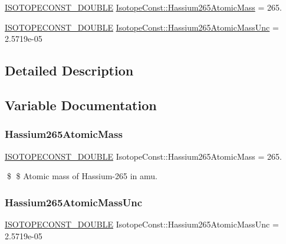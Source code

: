 \begin{DoxyCompactItemize}
\item 
\mbox{\hyperlink{group___isotope_const-_macros_ga8f45a7272ce02c0b4c65c44636ed719a}{I\+S\+O\+T\+O\+P\+E\+C\+O\+N\+S\+T\+\_\+\+D\+O\+U\+B\+LE}} \mbox{\hyperlink{group___isotope_const-_hassium-_hs265_ga317437d04e20725023eb9a24f665d884}{Isotope\+Const\+::\+Hassium265\+Atomic\+Mass}} = 265.
\item 
\mbox{\hyperlink{group___isotope_const-_macros_ga8f45a7272ce02c0b4c65c44636ed719a}{I\+S\+O\+T\+O\+P\+E\+C\+O\+N\+S\+T\+\_\+\+D\+O\+U\+B\+LE}} \mbox{\hyperlink{group___isotope_const-_hassium-_hs265_gad0a062570ab6e34c2d976d8e47e629fe}{Isotope\+Const\+::\+Hassium265\+Atomic\+Mass\+Unc}} = 2.\+5719e-\/05
\end{DoxyCompactItemize}


\subsection{Detailed Description}


\subsection{Variable Documentation}
\mbox{\label{group___isotope_const-_hassium-_hs265_ga317437d04e20725023eb9a24f665d884}} 
\subsubsection{\texorpdfstring{Hassium265\+Atomic\+Mass}{Hassium265AtomicMass}}
{\footnotesize\ttfamily \mbox{\hyperlink{group___isotope_const-_macros_ga8f45a7272ce02c0b4c65c44636ed719a}{I\+S\+O\+T\+O\+P\+E\+C\+O\+N\+S\+T\+\_\+\+D\+O\+U\+B\+LE}} Isotope\+Const\+::\+Hassium265\+Atomic\+Mass = 265.}

\$ \$ Atomic mass of Hassium-\/265 in amu. \mbox{\label{group___isotope_const-_hassium-_hs265_gad0a062570ab6e34c2d976d8e47e629fe}} 
\subsubsection{\texorpdfstring{Hassium265\+Atomic\+Mass\+Unc}{Hassium265AtomicMassUnc}}
{\footnotesize\ttfamily \mbox{\hyperlink{group___isotope_const-_macros_ga8f45a7272ce02c0b4c65c44636ed719a}{I\+S\+O\+T\+O\+P\+E\+C\+O\+N\+S\+T\+\_\+\+D\+O\+U\+B\+LE}} Isotope\+Const\+::\+Hassium265\+Atomic\+Mass\+Unc = 2.\+5719e-\/05}

